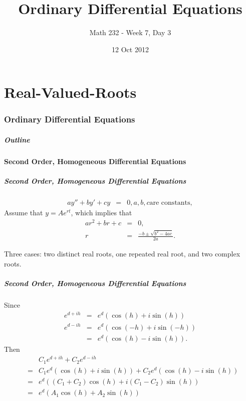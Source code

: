 \part{Real-Valued-Roots}
\section{Ordinary Differential Equations}

\title{Ordinary Differential Equations}
\subtitle{Math 232 - Week 7, Day 3}
\date{12 Oct 2012}

\begin{frame}
  \titlepage
\end{frame}

\begin{frame}
  \frametitle{Outline}
\end{frame}


\subsection{Second Order, Homogeneous Differential Equations}


\begin{frame}
  \frametitle{Second Order, Homogeneous Differential Equations}

  \begin{eqnarray*}
    a y'' + by' + cy & = & 0, a, b, c \text{are constants}, 
  \end{eqnarray*}
  Assume that $y =  A e^{rt}$, 
  which implies that
  \begin{eqnarray*}
    a r^2 + b r + c & = & 0, \\
    r & = & \frac{-b\pm\sqrt{b^2-4ac}}{2a}.
  \end{eqnarray*}

  Three cases: two distinct real roots, one repeated real root, and
  two complex roots.

\end{frame}

\begin{frame}
  \frametitle{Second Order, Homogeneous Differential Equations}
Since 
  \begin{eqnarray*}
  e^{d+ih} & = & e^d\left(\cos(h)+i\sin(h)\right) \\ 
  e^{d-ih} & = & e^d\left(\cos(-h)+i\sin(-h)\right)  \\
           & = & e^d\left(\cos(h)-i\sin(h)\right).  
  \end{eqnarray*}
Then  
  \begin{eqnarray*}
   &   &  C_1e^{d+ih} + C_2e^{d-ih}\\
   & = & C_1e^d\left(\cos(h)+i\sin(h)\right) 
       + C_2 e^d\left(\cos(h)-i\sin(h)\right)\\
   & = & e^d\left((C_1+C_2)\cos(h)+i(C_1-C_2)\sin(h)\right)\\
   & = & e^d\left(A_1\cos(h)+A_2\sin(h)\right)  
  \end{eqnarray*}

\end{frame}

